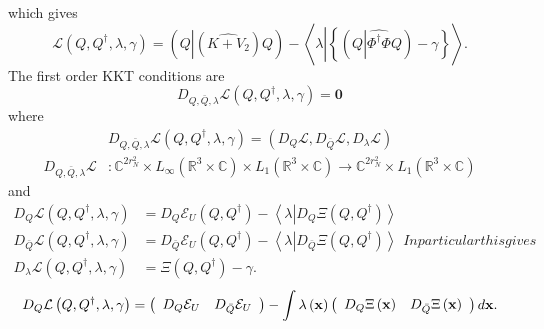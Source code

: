 \documentclass[aps,preprint]{revtex4}%
\begin{document}
which gives
\begin{equation}
\mathcal{L}\left(  Q,Q^{\dagger},\lambda,\gamma\right)  =\left(  Q\left\vert
\left(  \widehat{K+V_{2}}\right)  Q\right.  \right)  -\left\langle
\lambda\left\vert \left\{  \left(  Q\left\vert \widehat{\Phi^{\dagger}\Phi
}Q\right.  \right)  -\gamma\right\}  \right.  \right\rangle .
\end{equation}
The first order KKT conditions \cite{KKT} are%
\begin{equation}
D_{Q,\bar{Q},\lambda}\mathcal{L}\left(  Q,Q^{\dagger},\lambda,\gamma\right)
=\mathbf{0}%
\end{equation}
where
\begin{align}
&  D_{Q,\bar{Q},\lambda}\mathcal{L}\left(  Q,Q^{\dagger},\lambda
,\gamma\right)  =\left(  D_{Q}\mathcal{L},D_{\bar{Q}}\mathcal{L},D_{\lambda
}\mathcal{L}\right) \nonumber\\
D_{Q,\bar{Q},\lambda}\mathcal{L}  &  :\mathbb{C}^{2r_{N}^{2}}\times L_{\infty
}\left(  \mathbb{R}^{3}\times\mathbb{C}\right)  \times L_{1}\left(
\mathbb{R}^{3}\times\mathbb{C}\right)  \rightarrow\mathbb{C}^{2r_{N}^{2}%
}\times L_{1}\left(  \mathbb{R}^{3}\times\mathbb{C}\right)
\end{align}
and%
\begin{subequations}
\begin{align}
D_{Q}\mathcal{L}\left(  Q,Q^{\dagger},\lambda,\gamma\right)   &
=D_{Q}\mathcal{E}_{U}\left(  Q,Q^{\dagger}\right)  -\left\langle
\lambda\left\vert D_{Q}\Xi\left(  Q,Q^{\dagger}\right)  \right.  \right\rangle
\\
D_{\bar{Q}}\mathcal{L}\left(  Q,Q^{\dagger},\lambda,\gamma\right)   &
=D_{\bar{Q}}\mathcal{E}_{U}\left(  Q,Q^{\dagger}\right)  -\left\langle
\lambda\left\vert D_{\bar{Q}}\Xi\left(  Q,Q^{\dagger}\right)  \right.
\right\rangle \\
D_{\lambda}\mathcal{L}\left(  Q,Q^{\dagger},\lambda,\gamma\right)   &
=\Xi\left(  Q,Q^{\dagger}\right)  -\gamma.
\end{align}
In particular this gives
\end{subequations}
\begin{equation}
D_{Q}\mathcal{L}\left(  Q,Q^{\dagger},\lambda,\gamma\right)  =\left(
\begin{array}
[c]{cc}%
D_{Q}\mathcal{E}_{U} & D_{\bar{Q}}\mathcal{E}_{U}%
\end{array}
\right)  -\int\lambda\left(  \mathbf{x}\right)  \left(
\begin{array}
[c]{cc}%
D_{Q}\Xi\left(  \mathbf{x}\right)  & D_{\bar{Q}}\Xi\left(  \mathbf{x}\right)
\end{array}
\right)  d\mathbf{x.}%
\end{equation}
\end{document}
